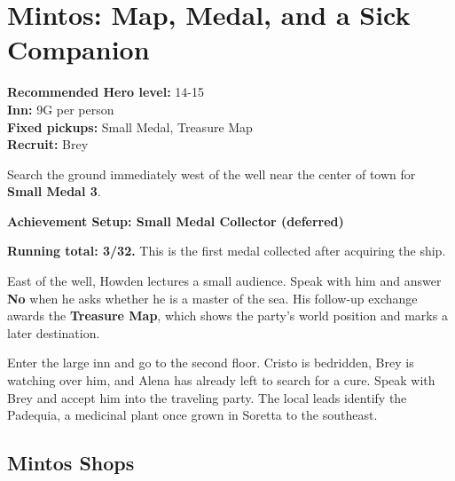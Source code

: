 \documentclass[
  american,
  10pt,
  letterpaper,
  oneside,
  open=any]{scrreprt}
\begin{document}
\section{Mintos: Map, Medal, and a Sick
Companion}\label{mintos-map-medal-and-a-sick-companion}

\textbf{Recommended Hero level:} 14-15\\
\textbf{Inn:} 9G per person\\
\textbf{Fixed pickups:} Small Medal, Treasure Map\\
\textbf{Recruit:} Brey

Search the ground immediately west of the well near the center of town
for \textbf{Small Medal 3}.

\begin{achievementsetup}

\textbf{Achievement Setup: Small Medal Collector (deferred)}

\textbf{Running total: 3/32.} This is the first medal collected after
acquiring the ship.

\end{achievementsetup}

East of the well, Howden lectures a small audience. Speak with him and
answer \textbf{No} when he asks whether he is a master of the sea. His
follow-up exchange awards the \textbf{Treasure Map}, which shows the
party's world position and marks a later destination.

Enter the large inn and go to the second floor. Cristo is bedridden,
Brey is watching over him, and Alena has already left to search for a
cure. Speak with Brey and accept him into the traveling party. The local
leads identify the Padequia, a medicinal plant once grown in Soretta to
the southeast.

\subsection{Mintos Shops}\label{mintos-shops}
\end{document}
